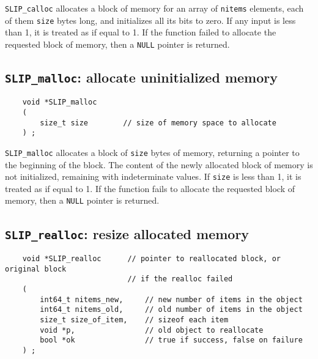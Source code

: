 \documentclass[12pt]{article}
\theoremstyle{definition}
\begin{document}
\verb|SLIP_calloc| allocates a block of memory for an array of \verb|nitems|
elements, each of them \verb|size| bytes long, and initializes all its bits to
zero. If any input is less than 1, it is treated as if equal to 1. If the
function failed to allocate the requested block of memory, then a \verb|NULL|
pointer is returned.

\cprotect\subsection{\verb|SLIP_malloc|: allocate uninitialized memory}
\label{ss:SLIP_malloc}

\begin{mdframed}[userdefinedwidth=6in]
{\footnotesize
\begin{verbatim}
    void *SLIP_malloc
    (
        size_t size        // size of memory space to allocate
    ) ;
\end{verbatim}
} \end{mdframed}

\verb|SLIP_malloc| allocates a block of \verb|size| bytes of memory, returning
a pointer to the beginning of the block. The content of the newly allocated
block of memory is not initialized, remaining with indeterminate values.
If \verb|size| is less than 1, it is treated as if equal to 1. If the function
fails to allocate the requested block of memory, then a \verb|NULL| pointer is
returned.

\cprotect\subsection{\verb|SLIP_realloc|: resize allocated memory}
\label{ss:SLIP_realloc}

\begin{mdframed}[userdefinedwidth=6in]
{\footnotesize
\begin{verbatim}
    void *SLIP_realloc      // pointer to reallocated block, or original block
                            // if the realloc failed
    (
        int64_t nitems_new,     // new number of items in the object
        int64_t nitems_old,     // old number of items in the object
        size_t size_of_item,    // sizeof each item
        void *p,                // old object to reallocate
        bool *ok                // true if success, false on failure
    ) ;
\end{verbatim}
} \end{mdframed}
\end{document}
